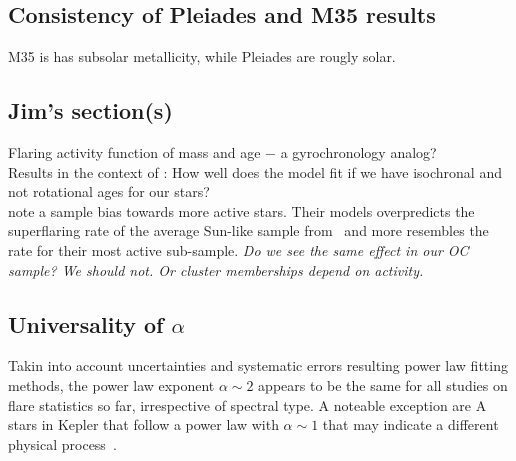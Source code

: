 \documentclass{aa}
\begin{document}
\subsection{Consistency of Pleiades and M35 results}
M35 is has subsolar metallicity, while Pleiades are rougly solar.
\subsection{Jim's section(s)}
Flaring activity function of mass and age $-$ a gyrochronology analog?
\\
Results in the context of \citet{davenport_flaresevolve_2019}:
How well does the model fit if we have isochronal and not rotational ages for our stars?
\\
\citet{davenport_flaresevolve_2019} note a sample bias towards more active stars. Their models overpredicts the superflaring rate of the average Sun-like sample from~\citet{shibayama_2013} and more resembles the rate for their most active sub-sample. \textit{Do we see the same effect in our OC sample? We should not. Or cluster memberships depend on activity.}
\subsection{Universality of $\alpha$}
Takin into account uncertainties and systematic errors resulting power law fitting methods, the power law exponent $\alpha\sim 2$ appears to be the same for all studies on flare statistics so far, irrespective of spectral type. A noteable exception are A stars in Kepler that follow a power law with $\alpha\sim 1$ that may indicate a different physical process~\citep{yang_keplerflares_2019}.
\end{document}
